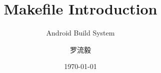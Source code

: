 \title{Makefile Introduction}
\subtitle{Android Build System}
\author{罗流毅}
\date{\today}
\def\website{}
